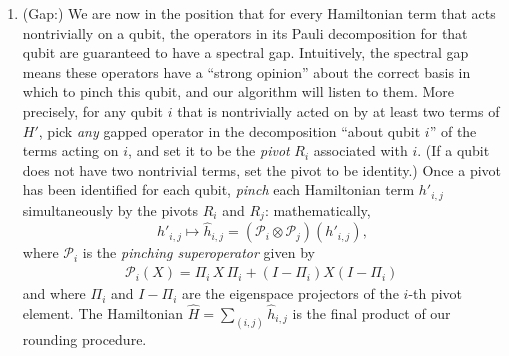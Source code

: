 \documentclass[11pt]{article}
\theoremstyle{plain}
\renewcommand{\cP}{\mathcal{P}}
\begin{document}
\begin{enumerate}
    \item (Gap:) We are now in the position that for every Hamiltonian term that acts nontrivially on a qubit, the operators in its Pauli decomposition for that qubit are guaranteed to have a spectral gap. Intuitively, the spectral gap means these operators have a ``strong opinion'' about the correct basis in which to pinch this qubit, and our algorithm will listen to them. More precisely, for any qubit $i$ that is nontrivially acted on by at least two terms of $H'$, pick \emph{any} gapped operator in the decomposition ``about qubit $i$'' of the terms acting on $i$, and set it to be the \emph{pivot} $R_i$ associated with $i$. (If a qubit does not have two nontrivial terms, set the pivot to be identity.) Once a pivot has been identified for each qubit, \emph{pinch} each Hamiltonian term $h'_{i,j}$ simultaneously by the pivots $R_i$ and $R_j$: mathematically,
    \[ h'_{i,j} \mapsto \hat{h}_{i,j} = (\cP_i \otimes \cP_j)(h'_{i,j}),\]
    where $\cP_i$ is the \emph{pinching superoperator} given by
 \begin{align}\label{eq:pinching-superoperator-overview}
    \mathcal{P}_i(X) = \Pi_i \, X \, \Pi_i + (I-\Pi_i) X (I-\Pi_i)\, 
    \end{align}
and where $\Pi_i$ and $I-\Pi_i$ are the eigenspace projectors of the $i$-th pivot element. The Hamiltonian $\hat{H} = \sum_{(i,j)} \hat{h}_{i,j}$ is the final product of our rounding procedure.


\end{enumerate}
\end{document}
